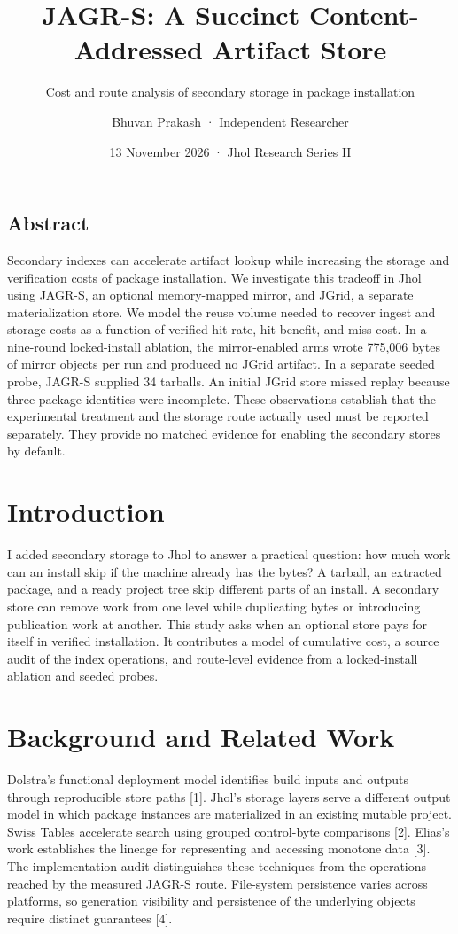 \documentclass[
  11pt,
  letterpaper,
]{article}
\title{JAGR-S: A Succinct Content-Addressed Artifact Store}
\subtitle{Cost and route analysis of secondary storage in package
installation}
\author{Bhuvan Prakash · Independent Researcher}
\date{13 November 2026 · Jhol Research Series II}
\begin{document}
\maketitle

\subsection*{Abstract}\label{abstract}

Secondary indexes can accelerate artifact lookup while increasing the
storage and verification costs of package installation. We investigate
this tradeoff in Jhol using JAGR-S, an optional memory-mapped mirror,
and JGrid, a separate materialization store. We model the reuse volume
needed to recover ingest and storage costs as a function of verified hit
rate, hit benefit, and miss cost. In a nine-round locked-install
ablation, the mirror-enabled arms wrote 775,006 bytes of mirror objects
per run and produced no JGrid artifact. In a separate seeded probe,
JAGR-S supplied 34 tarballs. An initial JGrid store missed replay
because three package identities were incomplete. These observations
establish that the experimental treatment and the storage route actually
used must be reported separately. They provide no matched evidence for
enabling the secondary stores by default.

\section{Introduction}\label{introduction}

I added secondary storage to Jhol to answer a practical question: how
much work can an install skip if the machine already has the bytes? A
tarball, an extracted package, and a ready project tree skip different
parts of an install. A secondary store can remove work from one level
while duplicating bytes or introducing publication work at another. This
study asks when an optional store pays for itself in verified
installation. It contributes a model of cumulative cost, a source audit
of the index operations, and route-level evidence from a locked-install
ablation and seeded probes.

\section{Background and Related Work}\label{background-and-related-work}

Dolstra's functional deployment model identifies build inputs and
outputs through reproducible store paths {[}1{]}. Jhol's storage layers
serve a different output model in which package instances are
materialized in an existing mutable project. Swiss Tables accelerate
search using grouped control-byte comparisons {[}2{]}. Elias's work
establishes the lineage for representing and accessing monotone data
{[}3{]}. The implementation audit distinguishes these techniques from
the operations reached by the measured JAGR-S route. File-system
persistence varies across platforms, so generation visibility and
persistence of the underlying objects require distinct guarantees
{[}4{]}.
\end{document}
